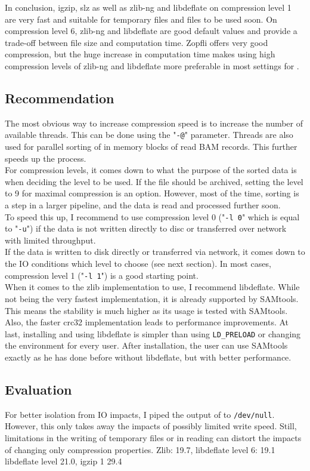 In conclusion, igzip, slz as well as zlib-ng and libdeflate on compression level 1 are very fast and suitable for temporary files and files to be used soon. On compression level 6, zlib-ng and libdeflate are good default values and provide a trade-off between file size and computation time. Zopfli offers very good compression, but the huge increase in computation time makes using high compression levels of zlib-ng and libdeflate more preferable in most settings for \sort.

\subsection{Recommendation}
The most obvious way to increase compression speed is to increase the number of available threads. This can be done using the "\texttt{-@}" parameter. Threads are also used for parallel sorting of in memory blocks of read BAM records. This further speeds up the process. \\
For compression levels, it comes down to what the purpose of the sorted data is when deciding the level to be used. 
If the file should be archived, setting the level to 9 for maximal compression is an option. However, most of the time, sorting is a step in a larger pipeline, and the data is read and processed further soon. \\
To speed this up, I recommend to use compression level 0 ("\texttt{-l 0}" which is equal to "\texttt{-u}") if the data is not written directly to  disc or transferred over network with limited throughput. \\
If the data is written to disk directly or transferred via network, it comes down to the IO conditions which level to choose (see next section). In most cases, compression level 1 ("\texttt{-l 1}") is a good starting point.\\
When it comes to the zlib implementation to use, I recommend libdeflate. While not being the very fastest implementation, it is already supported by SAMtools. This means the stability is much higher as its usage is tested with SAMtools. Also, the faster crc32 implementation leads to performance improvements. At last, installing and using libdeflate is simpler than using \texttt{LD\_PRELOAD} or changing the environment for every user. After installation, the user can use SAMtools exactly as he has done before without libdeflate, but with better performance.

\subsection{Evaluation}
For better isolation from IO impacts, I piped the output of \sort to \texttt{/dev/null}. However, this only takes away the impacts of possibly limited write speed. Still, limitations in the writing of temporary files or in reading can distort the impacts of changing only compression properties.
Zlib: 19.7, libdeflate level 6: 19.1 libdeflate level 21.0, igzip 1 29.4

